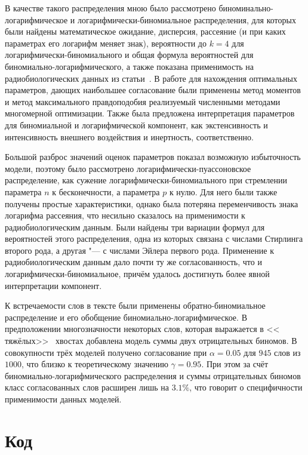 \documentclass[12pt, specialist, subf, substylefile = spbu.rtx]{disser}
\begin{document}
	В качестве такого распределения мною было рассмотрено биноминально-логарифмическое и логарифмически-биномиальное распределения, для которых были найдены математическое ожидание, дисперсия, рассеяние (и при каких параметрах его логарифм меняет знак), вероятности до $ k = 4 $ для логарифмически-биномиального и общая формула вероятностей для биномиально-логарифмического, а также показана применимость на радиобиологических данных из статьи~\cite{bib:alexeeva2008}. В работе для нахождения оптимальных параметров, дающих наибольшее согласование были применены метод моментов и метод максимального правдоподобия реализуемый численными методами многомерной оптимизации. Также была предложена интерпретация параметров для биномиальной и логарифмической компонент, как экстенсивность и интенсивность внешнего воздействия и инертность, соответственно.
	
	Большой разброс значений оценок параметров показал возможную избыточность модели, поэтому было рассмотрено логарифмически-пуассоновское распределение, как сужение логарифмически-биномиального при стремлении параметра $n$ к бесконечности, а параметра $p$ к нулю. Для него были также получены простые характеристики, однако была потеряна переменчивость знака логарифма рассеяния, что несильно сказалось на применимости к радиобиологическим данным. Были найдены три вариации формул для вероятностей этого распределения, одна из которых связана с числами Стирлинга второго рода, а другая "--- с числами Эйлера первого рода. Применение к радиобиологическим данным дало почти ту же согласованность, что и логарифмически-биномиальное, причём удалось достигнуть более явной интерпретации компонент.
	
	К встречаемости слов в тексте были применены обратно-биномиальное распределение и его обобщение биномиально-логарифмическое. В предположении многозначности некоторых слов, которая выражается в << тяжёлых>>~ хвостах добавлена модель суммы двух отрицательных биномов. В совокупности трёх моделей получено согласование при $\alpha = 0.05$ для $945$ слов из $1000$, что близко к теоретическому значению $\gamma = 0.95$. При этом за счёт биномиально-логарифмического распределения и суммы отрицательных биномов класс согласованных слов расширен лишь на $3.1 \%$, что говорит о специфичности применимости данных моделей.
	
	
	
	
	\appendix
	
	\chapter{Код}
	
\end{document}
